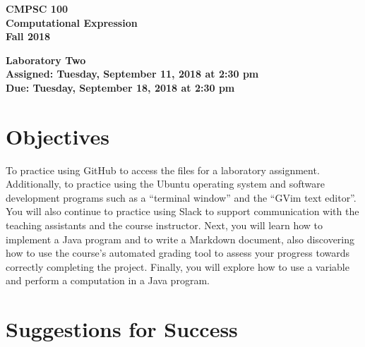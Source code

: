 \documentclass[11pt]{article}
\newcommand{\assignmentduedate}{September 18}
\newcommand{\assignmentassignedate}{September 11}
\newcommand{\assignmentnumber}{Two}
\newcommand{\labyear}{2018}
\newcommand{\labday}{Tuesday}
\newcommand{\labtime}{2:30 pm}
\newcommand{\assigneddate}{Assigned: \labday, \assignmentassignedate, \labyear{} at \labtime{}}
\newcommand{\duedate}{Due: \labday, \assignmentduedate, \labyear{} at \labtime{}}
\newcommand{\labtitle}[1]
{
  \begin{center}
    \begin{center}
      \bf
      CMPSC 100\\Computational Expression\\
      Fall 2018\\
      \medskip
    \end{center}
    \bf
    #1
  \end{center}
}
\begin{document}
\thispagestyle{empty}

\labtitle{Laboratory \assignmentnumber{} \\ \assigneddate{} \\ \duedate{}}

\section*{Objectives}

To practice using GitHub to access the files for a laboratory assignment.
Additionally, to practice using the Ubuntu operating system and software
development programs such as a ``terminal window'' and the ``GVim text editor''.
You will also continue to practice using Slack to support communication with the
teaching assistants and the course instructor. Next, you will learn how to
implement a Java program and to write a Markdown document, also discovering how
to use the course's automated grading tool to assess your progress towards
correctly completing the project. Finally, you will explore how to use a
variable and perform a computation in a Java program.

\section*{Suggestions for Success}
\end{document}
